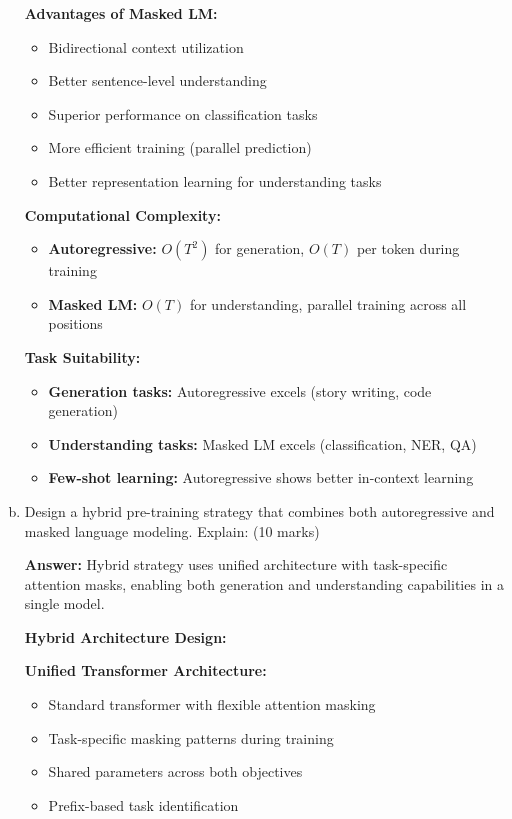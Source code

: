 \documentclass[12pt]{article}
\newcommand{\answer}[1]{{\color{answercolor}\textbf{Answer:} #1}}
\newcommand{\explanation}[1]{{\color{explanationcolor}#1}}
\begin{document}
\begin{center}
\begin{enumerate}[(a)]
{    \textbf{Advantages of Masked LM:}
    \begin{itemize}
        \item Bidirectional context utilization
        \item Better sentence-level understanding
        \item Superior performance on classification tasks
        \item More efficient training (parallel prediction)
        \item Better representation learning for understanding tasks
    \end{itemize}
    
    \textbf{Computational Complexity:}
    \begin{itemize}
        \item \textbf{Autoregressive:} $O(T^2)$ for generation, $O(T)$ per token during training
        \item \textbf{Masked LM:} $O(T)$ for understanding, parallel training across all positions
    \end{itemize}
    
    \textbf{Task Suitability:}
    \begin{itemize}
        \item \textbf{Generation tasks:} Autoregressive excels (story writing, code generation)
        \item \textbf{Understanding tasks:} Masked LM excels (classification, NER, QA)
        \item \textbf{Few-shot learning:} Autoregressive shows better in-context learning
    \end{itemize}
    }
    
    \item Design a hybrid pre-training strategy that combines both autoregressive and masked language modeling. Explain: \hfill (10 marks)
    
    \answer{Hybrid strategy uses unified architecture with task-specific attention masks, enabling both generation and understanding capabilities in a single model.}
    
    \explanation{
    \textbf{Hybrid Architecture Design:}
    
    \textbf{Unified Transformer Architecture:}
    \begin{itemize}
        \item Standard transformer with flexible attention masking
        \item Task-specific masking patterns during training
        \item Shared parameters across both objectives
        \item Prefix-based task identification
    \end{itemize}
    
}
\end{enumerate}
\end{center}
\end{document}

